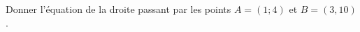 
\begin{exercice}\label{exosmath-0150}

Donner l'équation de la droite passant par les points \( A=(1;4)\) et \( B=(3,10)\).

\end{exercice}

